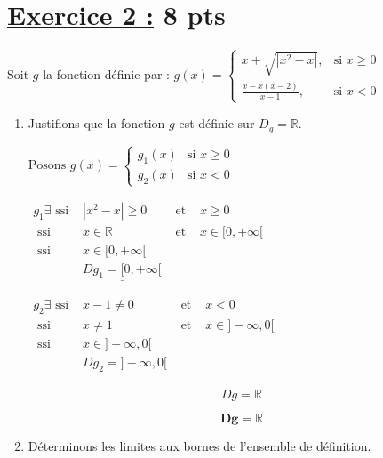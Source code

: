 \documentclass[12pt,a4paper]{article}
\begin{document}
\section*{\underline{Exercice 2 :} 8 pts }
Soit \( g \) la fonction définie par :
\(
g(x) =
\begin{cases}
    x + \sqrt{|x^2 - x|},     & \text{si } x \geq 0 \\
    \frac{x - x(x-2)}{x - 1}, & \text{si } x < 0
\end{cases}
\)

\begin{enumerate}
    \item Justifions que la fonction \( g \) est définie sur \( D_g = \mathbb{R} \).
    
                     \( \text{Posons }g(x) = \left\{
                    \begin{array}{ll}
                        g_{1}(x) & \text{si } x \geq 0    \\
                        g_{2}(x)         & \text{si } x < 0
                    \end{array}
                    \right. \)
                    
                    \(
                    \begin{aligned}
                    	 g_{1} \exists \text{ ssi }&  |x^2 - x| \geq 0  &\text{ et }&  x \geq 0 \\
                    								  \text{ ssi }&			x\in \mathbb{R}  &\text{ et }&  x\in[0,+\infty[ \\
                    								  \text{ ssi }&			 x\in[0,+\infty[\\
                    								  						&      \underline{Dg_{1} = [0,+\infty[}
                    \end{aligned}
										\)
										
										\(
									\begin{aligned}
											g_{2} \exists \text{ ssi }&  x - 1 \neq 0  &\text{ et }&  x < 0 \\
																		\text{ ssi }& x  \neq 1  &\text{ et }&  x\in]-\infty,0[ \\
																		\text{ ssi }&	x\in]-\infty,0[\\
																		&\underline{ Dg_{2} = ]-\infty,0[ }
									\end{aligned}
									\)

\[ Dg= \mathbb{R} \]									
									
									  \begin{resultbox}
                        \[
                            \mathbf{Dg= \mathbb{R} }
                        \]
                    \end{resultbox}	
    \item Déterminons les limites aux bornes de l'ensemble de définition.


\end{enumerate}
\end{document}
